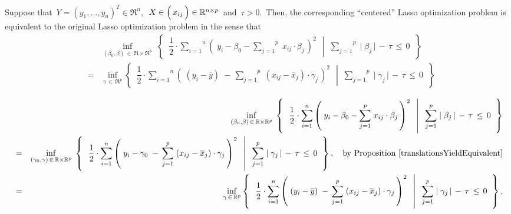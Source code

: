 \vskip 0.5cm
\begin{theorem}
\mbox{}
\vskip 0.0cm
\noindent
Suppose that
\,$Y = (y_{1},\ldots,y_{n})^{T} \in \Re^{n}$,\,
\,$X \in \left(\,\overset{{\color{white}-}}{x_{ij}}\,\right)\in\Re^{n \times p}$\, and
\,$\tau > 0$.\,
Then, the corresponding ``centered'' Lasso optimization problem is equivalent to
the original Lasso optimization problem in the sense that
\begin{eqnarray*}
&&
	\underset{(\beta_{0},\beta)\,\in\,\Re\times\Re^{p}}{\inf}\;
	\left\{\;\;
		\left.
		\dfrac{1}{2}
		\cdot
		\overset{n}{\underset{i=1}{\sum}}
		\left(\; y_{i} - \beta_{0} - \overset{p}{\underset{j=1}{\sum}}\; x_{ij}\cdot\beta_{j}\,\right)^{2}
		\;\;\,\right\vert\;\;
		\overset{p}{\underset{j=1}{\sum}}\;
		\vert\;\beta_{j}\,\vert
		\, - \,
		\tau \, \leq \, 0
		\;\;\right\}
\\
& = &
	\underset{\gamma\,\in\,\Re^{p}}{\inf}
	\left\{\;\;
		\left.
		\dfrac{1}{2}
		\cdot
		\overset{n}{\underset{i=1}{\sum}}
		\left(\; (y_{i} - \overline{y}) \;-\, \overset{p}{\underset{j=1}{\sum}}\; (x_{ij}-\overline{x}_{j})\cdot\gamma_{j}\,\right)^{2}
		\;\;\,\right\vert\;\;
		\overset{p}{\underset{j=1}{\sum}}\;
		\vert\;\gamma_{j}\,\vert
		\, - \,
		\tau \, \leq \, 0
		\;\;\right\}
\end{eqnarray*}
\end{theorem}
\proof
\begin{eqnarray*}
&&
	\underset{(\beta_{0},\beta)\,\in\,\Re\times\Re^{p}}{\inf}\;
	\left\{\;\;
		\left.
		\dfrac{1}{2}
		\cdot
		\overset{n}{\underset{i=1}{\sum}}
		\left(\; y_{i} - \beta_{0} - \overset{p}{\underset{j=1}{\sum}}\; x_{ij}\cdot\beta_{j}\,\right)^{2}
		\;\;\,\right\vert\;\;
		\overset{p}{\underset{j=1}{\sum}}\;
		\vert\;\beta_{j}\,\vert
		\, - \,
		\tau \, \leq \, 0
		\;\;\right\}
\\
& = &
	\underset{(\gamma_{0},\gamma)\,\in\,\Re\times\Re^{p}}{\inf}\;
	\left\{\;\;
		\left.
		\dfrac{1}{2}
		\cdot
		\overset{n}{\underset{i=1}{\sum}}
		\left(\; y_{i} - \gamma_{0} \;-\, \overset{p}{\underset{j=1}{\sum}}\; (x_{ij}-\overline{x}_{j})\cdot\gamma_{j}\,\right)^{2}
		\;\;\,\right\vert\;\;
		\overset{p}{\underset{j=1}{\sum}}\;
		\vert\;\gamma_{j}\,\vert
		\, - \,
		\tau \, \leq \, 0
		\;\;\right\},
	\quad
	\textnormal{by Proposition \ref{translationsYieldEquivalent}}
\\
& = &
	\underset{\gamma\,\in\,\Re^{p}}{\inf}
	\left\{\;\;
		\left.
		\dfrac{1}{2}
		\cdot
		\overset{n}{\underset{i=1}{\sum}}
		\left(\; (y_{i} - \overline{y}) \;-\, \overset{p}{\underset{j=1}{\sum}}\; (x_{ij}-\overline{x}_{j})\cdot\gamma_{j}\,\right)^{2}
		\;\;\,\right\vert\;\;
		\overset{p}{\underset{j=1}{\sum}}\;
		\vert\;\gamma_{j}\,\vert
		\, - \,
		\tau \, \leq \, 0
		\;\;\right\},
\end{eqnarray*}
